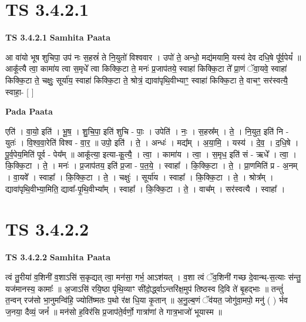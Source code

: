 \documentclass[17pt]{extarticle}
\begin{document}
\section*{ TS 3.4.2.1 }

\textbf{TS 3.4.2.1 } \newline
\textbf{Samhita Paata} \newline

आ वा॑यो भूष शुचिपा॒ उप॑ नः स॒हस्रं॑ ते नि॒युतो॑ विश्ववार । उपो॑ ते॒ अन्धो॒ मद्य॑मयामि॒ यस्य॑ देव दधि॒षे पू᳚र्व॒पेयं᳚ ॥ आकू᳚त्यै त्वा॒ कामा॑य त्वा स॒मृधे᳚ त्वा किक्कि॒टा ते॒ मनः॑ प्र॒जाप॑तये॒ स्वाहा॑ किक्कि॒टा ते᳚ प्रा॒णं ॅवा॒यवे॒ स्वाहा॑ किक्कि॒टा ते॒ चक्षुः॒ सूर्या॑य॒ स्वाहा॑ किक्कि॒टा ते॒ श्रोत्रं॒ द्यावा॑पृथि॒वीभ्याꣳ॒॒ स्वाहा॑ किक्कि॒टा ते॒ वाचꣳ॒॒ सर॑स्वत्यै॒ स्वाहा॒- [  ] \newline

\textbf{Pada Paata} \newline

एति॑ । वा॒यो॒ इति॑ । भू॒ष॒ । शु॒चि॒पा॒ इति॑ शुचि - पाः॒ । उपेति॑ । नः॒ । स॒हस्र᳚म् । ते॒ । नि॒युत॒ इति॑ नि - युतः॑ । वि॒श्व॒वा॒रेति॑ विश्व - वा॒र॒ ॥ उपो॒ इति॑ । ते॒ । अन्धः॑ । मद्य᳚म् । अ॒या॒मि॒ । यस्य॑ । दे॒व॒ । द॒धि॒षे । पू॒र्व॒पेय॒मिति॑ पूर्व - पेय᳚म् ॥ आकू᳚त्या॒ इत्या-कू॒त्यै॒ । त्वा॒ । कामा॑य । त्वा॒ । स॒मृध॒ इति॑ सं - ऋधे᳚ । त्वा॒ । कि॒क्कि॒टा । ते॒ । मनः॑ । प्र॒जाप॑तय॒ इति॑ प्र॒जा - प॒त॒ये॒ । स्वाहा᳚ । कि॒क्कि॒टा । ते॒ । प्रा॒णमिति॑ प्र - अ॒नम् । वा॒यवे᳚ । स्वाहा᳚ । कि॒क्कि॒टा । ते॒ । चक्षुः॑ । सूर्या॑य । स्वाहा᳚ । कि॒क्कि॒टा । ते॒ । श्रोत्र᳚म् । द्यावा॑पृथि॒वीभ्या॒मिति॒ द्यावा᳚-पृ॒थि॒वीभ्या᳚म् । स्वाहा᳚ । कि॒क्कि॒टा । ते॒ । वाच᳚म् । सर॑स्वत्यै । स्वाहा᳚ ।  \newline




\section*{ TS 3.4.2.2 }

\textbf{TS 3.4.2.2 } \newline
\textbf{Samhita Paata} \newline

त्वं तु॒रीया॑ व॒शिनी॑ व॒शाऽसि॑ स॒कृद्यत् त्वा॒ मन॑सा॒ गर्भ॒ आऽश॑यत् । व॒शा त्वं ॅव॒शिनी॑ गच्छ दे॒वान्थ्-स॒त्याः स॑न्तु॒ यज॑मानस्य॒ कामाः᳚ ॥ अ॒जाऽसि॑ रयि॒ष्ठा पृ॑थि॒व्याꣳ सी॑दो॒र्द्ध्वाऽन्तरि॑क्ष॒मुप॑ तिष्ठस्व दि॒वि ते॑ बृ॒हद्भाः ॥ तन्तुं॑ त॒न्वन् रज॑सो भा॒नुमन्वि॑हि॒ ज्योति॑ष्मतः प॒थो र॑क्ष धि॒या कृ॒तान् ॥ अ॒नु॒ल्ब॒णं ॅव॑यत॒ जोगु॑वा॒मपो॒ मनु॑ ( ) र्भव ज॒नया॒ दैव्यं॒ जनं᳚ ॥ मन॑सो ह॒विर॑सि प्र॒जाप॑ते॒र्वर्णो॒ गात्रा॑णां ते गात्र॒भाजो॑ भूयास्म ॥ \newline
\end{document}
